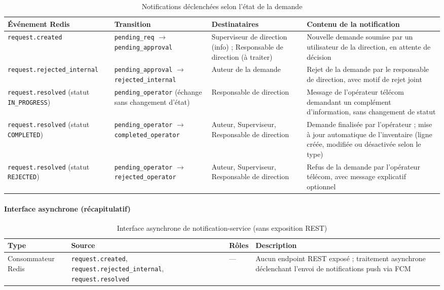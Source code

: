 \documentclass[11pt,a4paper]{article}
\begin{document}
\begin{table}[H]
\centering
\small
\begin{tabular}{|p{3cm}|p{2.6cm}|p{3.4cm}|p{5.2cm}|}
\hline
\textbf{Événement Redis} & \textbf{Transition} & \textbf{Destinataires} & \textbf{Contenu de la notification} \\
\hline
\texttt{request.created} &
\texttt{pending\_req} $\rightarrow$ \texttt{pending\_approval} &
Superviseur de direction (info) ; Responsable de direction (à traiter) &
Nouvelle demande soumise par un utilisateur de la direction, en attente de décision \\
\hline
\texttt{request.rejected\_internal} &
\texttt{pending\_approval} $\rightarrow$ \texttt{rejected\_internal} &
Auteur de la demande &
Rejet de la demande par le responsable de direction, avec motif de rejet joint \\
\hline
\texttt{request.resolved} (statut \texttt{IN\_PROGRESS}) &
\texttt{pending\_operator} (échange sans changement d'état) &
Responsable de direction &
Message de l'opérateur télécom demandant un complément d'information, sans changement de statut \\
\hline
\texttt{request.resolved} (statut \texttt{COMPLETED}) &
\texttt{pending\_operator} $\rightarrow$ \texttt{completed\_operator} &
Auteur, Superviseur, Responsable de direction &
Demande finalisée par l'opérateur ; mise à jour automatique de l'inventaire (ligne créée, modifiée ou désactivée selon le type) \\
\hline
\texttt{request.resolved} (statut \texttt{REJECTED}) &
\texttt{pending\_operator} $\rightarrow$ \texttt{rejected\_operator} &
Auteur, Superviseur, Responsable de direction &
Refus de la demande par l'opérateur télécom, avec message explicatif optionnel \\
\hline
\end{tabular}
\caption{Notifications déclenchées selon l'état de la demande}
\end{table}

\paragraph{Interface asynchrone (récapitulatif)}
\begin{table}[H]
\centering
\small
\begin{tabular}{|p{2cm}|p{2.6cm}|p{2cm}|p{5.5cm}|}
\hline
\textbf{Type} & \textbf{Source} & \textbf{Rôles} & \textbf{Description} \\
\hline
Consommateur Redis & \texttt{request.created}, \texttt{request.rejected\_internal}, \texttt{request.resolved} & --- & Aucun endpoint REST exposé ; traitement asynchrone déclenchant l'envoi de notifications push via FCM \\
\hline
\end{tabular}
\caption{Interface asynchrone de notification-service (sans exposition REST)}
\end{table}
\end{document}
